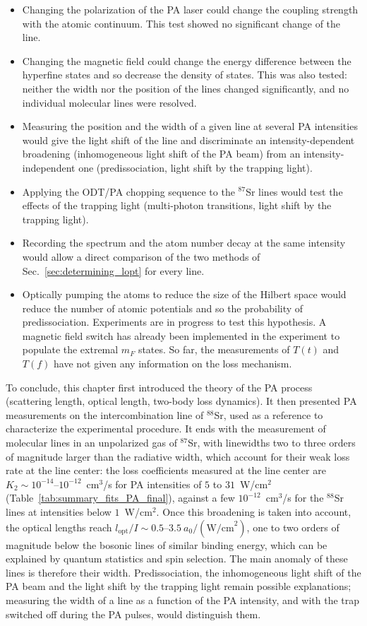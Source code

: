 \begin{itemize}
    \item Changing the polarization of the PA laser could change the coupling strength with the atomic continuum. This test showed no significant change of the line.
    \item Changing the magnetic field could change the energy difference between the hyperfine states and so decrease the density of states. This was also tested: neither the width nor the position of the lines
    changed significantly, and no individual molecular lines were resolved.
    \item Measuring the position and the width of a given line at several PA intensities would give the light shift of the line and discriminate an intensity-dependent broadening (inhomogeneous light shift of the PA beam) from an intensity-independent one (predissociation, light shift by the trapping light).
    \item Applying the ODT/PA chopping sequence to the $^{87}$Sr lines would test the effects of the trapping light (multi-photon transitions, light shift by the trapping light).
    \item Recording the spectrum and the atom number decay at the same intensity would allow a direct comparison of the two methods of Sec.~\ref{sec:determining_lopt} for every line.
    \item Optically pumping the atoms to reduce the size of the Hilbert space would reduce the number of atomic potentials and so the probability of predissociation. Experiments are
    in progress to test this hypothesis. A magnetic field switch has already been implemented in the experiment to populate the extremal $m_F$ states. So far, the measurements of $T(t)$ and $T(f)$ have not given any information on the loss mechanism.
\end{itemize}


        

To conclude, this chapter first introduced the theory of the PA process (scattering length, optical length, two-body loss dynamics).
It then presented PA measurements on the intercombination line of $^{88}$Sr, used as a reference to characterize the experimental procedure. It ends with the measurement of molecular lines in an
unpolarized gas of $^{87}$Sr, with linewidths two to three orders of magnitude larger than the radiative width, which account for their weak loss rate at the line center: the loss coefficients measured at the line center are $K_2\sim10^{-14}$--$10^{-12}$~cm$^3$/s for PA intensities of $5$ to $31$~W/cm$^2$ (Table~\ref{tab:summary_fits_PA_final}), against a few $10^{-12}$~cm$^3$/s for the $^{88}$Sr lines at intensities below $1$~W/cm$^2$. Once this broadening is taken into account, the optical lengths reach $l_{\text{opt}}/I \sim 0.5$--$3.5~a_0/(\text{W/cm}^2)$, one to two orders of magnitude below the bosonic lines of similar binding energy, which can be explained by quantum statistics and spin selection. The main anomaly of these lines is therefore their width. Predissociation, the inhomogeneous light shift of the PA beam and the light shift by the trapping light remain possible explanations; measuring the width of a line as a function of the PA intensity, and with the trap switched off during the PA pulses, would distinguish them.
